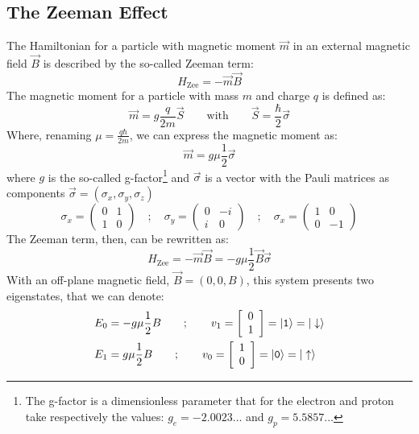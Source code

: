 \subsection{The Zeeman Effect}
The Hamiltonian for a particle with magnetic moment $\vec{m}$ in an external magnetic field $\vec{B}$ is described by the so-called Zeeman term:
\begin{equation}
  H_{\text{Zee}} = -\vec{m}\vec{B}
\end{equation}
The magnetic moment for a particle with mass $m$ and charge $q$ is defined as:
\begin{equation*}
  \vec{m} = g\frac{q}{2m}\vec{S} \qquad\text{with}\qquad \vec{S} =
  \frac{\hbar}{2}\vec{\sigma}
\end{equation*}
Where, renaming $\mu = \frac{q\hbar}{2m}$, we can express the magnetic moment as:
\begin{equation}
  \vec{m} = g\mu\frac{1}{2}\vec{\sigma}
\label{magmom}
\end{equation}
where $g$ is the so-called g-factor\footnote{The g-factor is a dimensionless parameter that for the electron and proton take respectively the values: $g_e=-2.0023\dots$ and $g_p=5.5857\dots$} and $\vec{\sigma}$ is a vector with the Pauli matrices as components $\vec{\sigma}= \left(\sigma_x,\sigma_y,\sigma_z\right)$
\begin{equation}
  \sigma_x=\left(\begin{array}{cc}
    0 & 1 \\
    1 & 0
    \end{array}\right)\quad;\quad
  \sigma_y=\left(\begin{array}{cc}
    0 & -i \\
    i & 0
    \end{array}\right)\quad;\quad
  \sigma_x=\left(\begin{array}{cc}
    1 & 0 \\
    0 & -1
    \end{array}\right)
\end{equation}
The Zeeman term, then, can be rewritten as:
\begin{equation}
  H_{\text{Zee}} = -\vec{m}\vec{B} = -g\mu\frac{1}{2}\vec{B}\vec{\sigma}
\end{equation}
With an off-plane magnetic field, $\vec{B}=(0,0,B)$, this system presents two eigenstates, that we can denote:
\begin{equation}
  \begin{split}
    E_0 &= -g\mu\frac{1}{2}B \qquad;\qquad
    v_1 = \left[\begin{array}{c}
    0\\
    1
    \end{array}\right] = |\texttt{1}\rangle = |\downarrow\rangle\\
    E_1 &= g\mu\frac{1}{2}B \qquad;\qquad
    v_0 = \left[\begin{array}{c}
    1\\
    0
    \end{array}\right] = |\texttt{0}\rangle =|\uparrow\rangle
  \end{split}
\end{equation}
